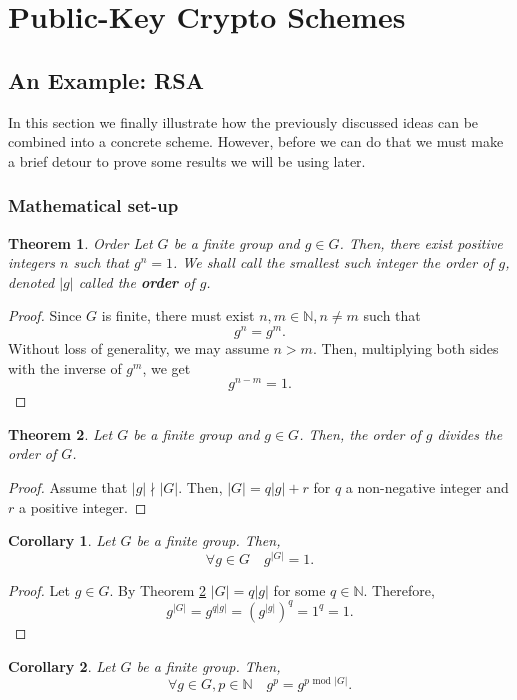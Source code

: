 \documentclass{article}
\newtheorem{theorem}{Theorem}[section]
\newtheorem{corollary}{Corollary}[theorem]
\theoremstyle{definition}
\newcommand{\Nat}{\mathbb{N}}
\renewcommand{\mod}{\,\,\text{mod}\,\,}
\begin{document}
\section{Public-Key Crypto Schemes}
\subsection{An Example: RSA}
In this section we finally illustrate how the previously discussed ideas can be
combined into a concrete scheme. However, before we can do that we must make a
brief detour to prove some results we will be using later.
\subsubsection{Mathematical set-up}
\begin{theorem}{Order}
  Let $G$ be a finite group and $g \in G$. Then, there exist positive integers
  $n$ such that $g^n = 1$. We shall call the smallest such integer the order of
  $g$, denoted $|g|$ called the \textbf{order} of $g$.
\end{theorem}
\begin{proof}
  Since $G$ is finite, there must exist $n, m \in \Nat, n \neq m$ such that
  \[
    g^n = g^m.
  \]
  Without loss of generality, we may assume $n > m$. Then, multiplying both
  sides with the inverse of $g^m$, we get
  \[
    g^{n - m } = 1.
  \]
\end{proof}
\begin{theorem}
  \label{thm:elemorderdiv}
  Let $G$ be a finite group and $g \in G$. Then, the order of $g$ divides the
  order of $G$.
\end{theorem}
\begin{proof}
  Assume that $|g| \nmid |G|$. Then, $|G| = q|g| + r$ for $q$ a non-negative
  integer and $r$ a positive integer.
\end{proof}
\begin{corollary}
  \label{cor:elemgroupordpow}
  Let $G$ be a finite group. Then,
  \[
    \forall g \in G\quad g^{|G|} = 1.
  \]
\end{corollary}
\begin{proof}
  Let $g \in G$. By Theorem \ref{thm:elemorderdiv} $|G| = q|g|$ for some $q \in
  \Nat$. Therefore,
  \[
    g^{|G|} = g^{q|g|} = (g^{|g|})^q = 1^q = 1.
  \]
\end{proof}
\begin{corollary}
  \label{thm:groupordpow}
  Let $G$ be a finite group. Then,
  \[
    \forall g \in G, p \in \Nat\quad g^p = g^{p \mod |G|}.
  \]
\end{corollary}
\end{document}
